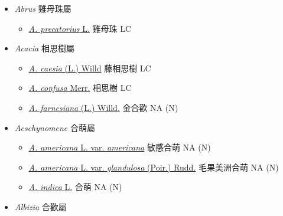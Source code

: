 
  \begin{itemize}
 \item[] \textit{Abrus} 雞母珠屬
                                
  \begin{itemize}
        \item[] \href{http://www.theplantlist.org/tpl1.1/search?q=Abrus+precatorius}{\textit{A. precatorius} L.}   雞母珠   LC
  \end{itemize}
 \item[] \textit{Acacia} 相思樹屬
                                
  \begin{itemize}
        \item[] \href{http://www.theplantlist.org/tpl1.1/search?q=Acacia+caesia}{\textit{A. caesia} (L.) Willd}   藤相思樹   LC
        \item[] \href{http://www.theplantlist.org/tpl1.1/search?q=Acacia+confusa}{\textit{A. confusa} Merr.}   相思樹   LC
        \item[] \href{http://www.theplantlist.org/tpl1.1/search?q=Acacia+farnesiana}{\textit{A. farnesiana} (L.) Willd.}   金合歡   NA (N)
  \end{itemize}
 \item[] \textit{Aeschynomene} 合萌屬
                                
  \begin{itemize}
        \item[] \href{http://www.theplantlist.org/tpl1.1/search?q=Aeschynomene+americana+var.+americana}{\textit{A. americana} L. var. \textit{americana}}   敏感合萌   NA (N)
        \item[] \href{http://www.theplantlist.org/tpl1.1/search?q=Aeschynomene+americana+var.+glandulosa}{\textit{A. americana} L. var. \textit{glandulosa} (Poir.) Rudd.}   毛果美洲合萌   NA (N)
        \item[] \href{http://www.theplantlist.org/tpl1.1/search?q=Aeschynomene+indica}{\textit{A. indica} L.}   合萌   NA (N)
  \end{itemize}
 \item[] \textit{Albizia} 合歡屬
                                

\end{itemize}
